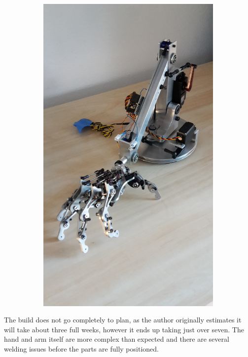 \documentclass[progress]{cmpreport}
\begin{document}
\begin{figure} [H]
\begin{subfigure}[h]{0.4\linewidth}
		\includegraphics[trim=20cm 0cm 22cm 0cm, clip=true, totalheight=0.29\textheight, angle=-90]{photos/Day42-pt5.jpg}
	\end{subfigure}%
\end{figure}
The build does not go completely to plan, as the author originally estimates it will take about three full weeks, however it ends up taking just over seven. The hand and arm itself are more complex than expected and there are several welding issues before the parts are fully positioned. 
\end{document}

